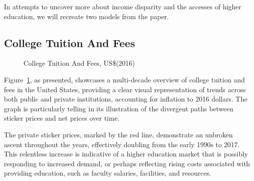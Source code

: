 \documentclass[
  letterpaper,
  DIV=11,
  numbers=noendperiod]{scrartcl}
\begin{document}
In attempts to uncover more about income disparity and the accesses of
higher education, we will recreate two models from the paper.

\subsection{College Tuition And Fees}\label{college-tuition-and-fees}

\begin{figure}


\caption{\label{fig-stickers}College Tuition And Fees, US\$(2016)}

\end{figure}%

Figure~\ref{fig-stickers}, as presented, showcases a multi-decade
overview of college tuition and fees in the United States, providing a
clear visual representation of trends across both public and private
institutions, accounting for inflation to 2016 dollars. The graph is
particularly telling in its illustration of the divergent paths between
sticker prices and net prices over time.

The private sticker prices, marked by the red line, demonstrate an
unbroken ascent throughout the years, effectively doubling from the
early 1990s to 2017. This relentless increase is indicative of a higher
education market that is possibly responding to increased demand, or
perhaps reflecting rising costs associated with providing education,
such as faculty salaries, facilities, and resources.
\end{document}
